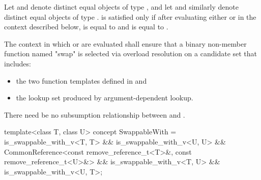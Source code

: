 \begin{itemdescr}
\pnum
Let  and  denote distinct equal objects of type ,
and let  and  similarly denote distinct equal objects of
type .  is satisfied only if after
evaluating either  or  in the context
described below,  is equal to  and  is equal to
.

\pnum
The context in which  or  are evaluated
shall ensure that a binary non-member function named "swap" is selected via
overload resolution on a candidate set that includes:
\begin{itemize}
\item the two  function templates defined in
   and
\item the lookup set produced by argument-dependent
  lookup.
\end{itemize}

\pnum
There need be no subsumption relationship between
and
.
\end{itemdescr}

%
\begin{itemdecl}
template<class T, class U>
concept SwappableWith =
  is_swappable_with_v<T, T> && is_swappable_with_v<U, U> &&
  CommonReference<const remove_reference_t<T>&, const remove_reference_t<U>&> &&
  is_swappable_with_v<T, U> && is_swappable_with_v<U, T>;
\end{itemdecl}

